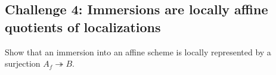 \subsection*{Challenge 4: Immersions are locally affine quotients of localizations}
\begin{problem}\label{chal:vi22-04}
Show that an immersion into an affine scheme is locally represented by a surjection $A_f\twoheadrightarrow B$.
\end{problem}

